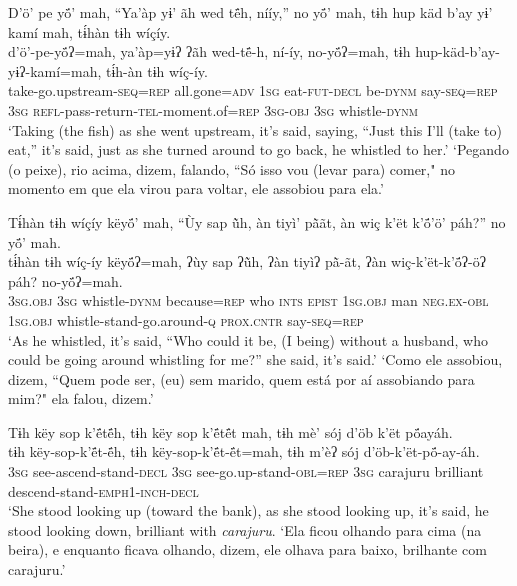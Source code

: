 \documentclass[output=paper,
modfonts,nonflat
]{langsci/langscibook}
\begin{document}
\ea  D’ö’ pe yö́’ mah, “Ya’àp yɨ’ ãh wed të́h, nííy,” no yö́’ mah, tɨh hup käd b’ay yɨ’ kamí mah, tɨ́hàn tɨh wíçíy.\\ 
\gll d’ö’-pe-yö́ʔ=mah, ya’àp=yɨʔ ʔãh wed-të́-h, ní-íy, no-yö́ʔ=mah, tɨh hup-käd-b’ay-yɨʔ-kamí=mah, tɨ́h-àn tɨh wíç-íy.\\
     take-go.upstream\textsc{-seq=rep} all.gone\textsc{=adv} \textsc{1sg} eat\textsc{-fut-decl} be\textsc{-dynm} say\textsc{-seq=rep} \textsc{3sg} \textsc{refl-}pass-return\textsc{-tel}-moment.of\textsc{=rep} \textsc{3sg-obj} \textsc{3sg} whistle\textsc{-dynm}\\
\glt ‘Taking (the fish) as she went upstream, it’s said, saying, “Just this I’ll (take to) eat,” it’s said, just as she turned around to go back, he whistled to her.'
\glt ‘Pegando (o peixe), rio acima, dizem, falando, “Só isso vou (levar para) comer," no momento em que ela virou para voltar, ele assobiou para ela.'
\z 

\ea  Tɨ́hàn tɨh wíçíy këyö́’ mah, “Ùy sap ũ̀h, àn tiyì’ pã̀ãt, àn wiç k’ët k’ö́’ö’ páh?”{\footnotemark} no yö́’ mah.\\ 
\gll tɨ́hàn tɨh wíç-íy këyö́ʔ=mah, ʔùy sap ʔũ̀h, ʔàn tiyìʔ pã̀-ãt, ʔàn wiç-k’ët-k’ö́ʔ-öʔ páh? no-yö́ʔ=mah.\\
     \textsc{3sg.obj} \textsc{3sg} whistle\textsc{-dynm} because\textsc{=rep} who \textsc{ints} \textsc{epist} \textsc{1sg.obj} man \textsc{neg.ex-obl} \textsc{1sg.obj} whistle-stand-go.around\textsc{-q} \textsc{prox.cntr} say\textsc{-seq=rep}\\
\glt ‘As he whistled, it’s said, “Who could it be, (I being) without a husband, who could be going around whistling for me?” she said, it’s said.'
\glt ‘Como ele assobiou, dizem, “Quem pode ser, (eu) sem marido, quem está por aí assobiando para mim?" ela falou, dizem.'
\z 

\ea  Tɨh këy sop k’ë́të́h, tɨh këy sop k’ë́të́t mah, tɨh mè’ sój d’öb k’ët pö́ayáh.\\ 
\gll tɨh këy-sop-k’ë́t-ë́h, tɨh këy-sop-k’ë́t-ë́t=mah, tɨh m’èʔ sój d’öb-k’ët-pö́-ay-áh.\\
     \textsc{3sg} see-ascend-stand\textsc{-decl} \textsc{3sg} see-go.up-stand\textsc{-obl=rep} \textsc{3sg} carajuru brilliant descend-stand\textsc{-emph1-inch-decl}\\
\glt ‘She stood looking up (toward the bank), as she stood looking up, it’s said, he stood looking down, brilliant with \textit{carajuru}.{\footnotemark}
\glt ‘Ela ficou olhando para cima (na beira), e enquanto ficava olhando, dizem, ele olhava para baixo, brilhante com carajuru.'
\z 
\end{document}

